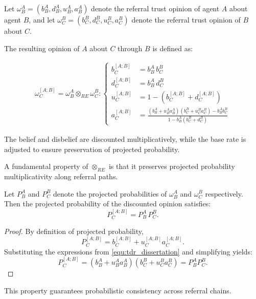 \begin{definition}
    Let $\omega_B^A = (b_B^A, d_B^A, u_B^A, a_B^A)$ denote the referral trust opinion of agent $A$ about agent $B$, and let $\omega_C^B = (b_C^B, d_C^B, u_C^B, a_C^B)$ denote the referral trust opinion of $B$ about $C$. 

The resulting opinion of $A$ about $C$ through $B$ is defined as:

\begin{align}
\label{equ:tdr_dissertation}
\omega_C^{[A;B]} = \omega_B^A \otimes_{RE} \omega_C^B:
\begin{cases}
b_C^{[A;B]} &= b_B^A \, b_C^B \\
d_C^{[A;B]} &= b_B^A \, d_C^B \\
u_C^{[A;B]} &= 1 - \left( b_C^{[A;B]} + d_C^{[A;B]} \right) \\
a_C^{[A;B]} &= 
\displaystyle
\frac{(b_B^A + u_B^A a_B^A)(b_C^B + u_C^B a_C^B) - b_B^A b_C^B}
{1 - b_B^A (b_C^B + d_C^B)}
\end{cases}
\end{align}

The belief and disbelief are discounted multiplicatively, while the base rate is adjusted to ensure preservation of projected probability.
\end{definition}

A fundamental property of $\otimes_{RE}$ is that it preserves projected probability multiplicativity along referral paths.

\begin{theorem}
\label{thm:projected_probability_preservation}
Let $P_B^A$ and $P_C^B$ denote the projected probabilities of $\omega_B^A$ and $\omega_C^B$ respectively. Then the projected probability of the discounted opinion satisfies:
\begin{equation}
P_C^{[A;B]} = P_B^A \, P_C^B.
\end{equation}
\end{theorem}

\begin{proof}
By definition of projected probability,
\[
P_C^{[A;B]} = b_C^{[A;B]} + u_C^{[A;B]} a_C^{[A;B]}.
\]
Substituting the expressions from \cref{equ:tdr_dissertation} and simplifying yields:
\[
P_C^{[A;B]} = (b_B^A + u_B^A a_B^A)(b_C^B + u_C^B a_C^B) = P_B^A P_C^B.
\]
\end{proof}
This property guarantees probabilistic consistency across referral chains.

